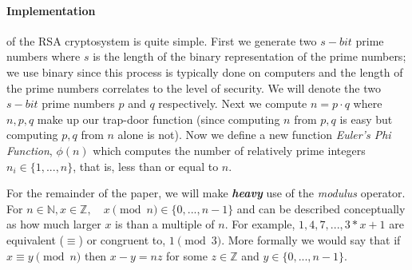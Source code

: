\documentclass[12pt]{article}
\newcommand{\Z}{\mathbb{Z}}
\newcommand{\N}{\mathbb{N}}
\begin{document}
\paragraph{Implementation} of the RSA cryptosystem is quite simple.  First we generate two $s-bit$ prime numbers where $s$ is the length of the binary representation of the prime numbers; we use binary since this process is typically done on computers and the length of the prime numbers correlates to the level of security.  We will denote the two $s-bit$ prime numbers $p$ and $q$ respectively.  Next we compute $n = p\cdot q$ where $n,p,q$ make up our trap-door function (since computing $n$ from $p,q$ is easy but computing $p,q$ from $n$ alone is not).  Now we define a new function \textit{Euler's Phi Function}, $\phi(n)$ which computes the number of relatively prime integers $n_i\in\{1,...,n\}$, that is, less than or equal to $n$.

For the remainder of the paper, we will make \textbf{\emph{heavy}} use of the \textit{modulus} operator.  For $n\in \N,x\in \Z ,\quad x\pmod{n}\in \{0,...,n-1\}$ and can be described conceptually as how much larger $x$ is than a multiple of $n$.  For example, $1,4,7,..., 3*x+1$ are equivalent ($\equiv$) or congruent to, $1\pmod{3}$.  More formally we would say that if $x\equiv y\pmod{n}$ then $x-y = nz$ for some $z\in\Z$ and $y\in \{0,...,n-1\}$.
\end{document}
